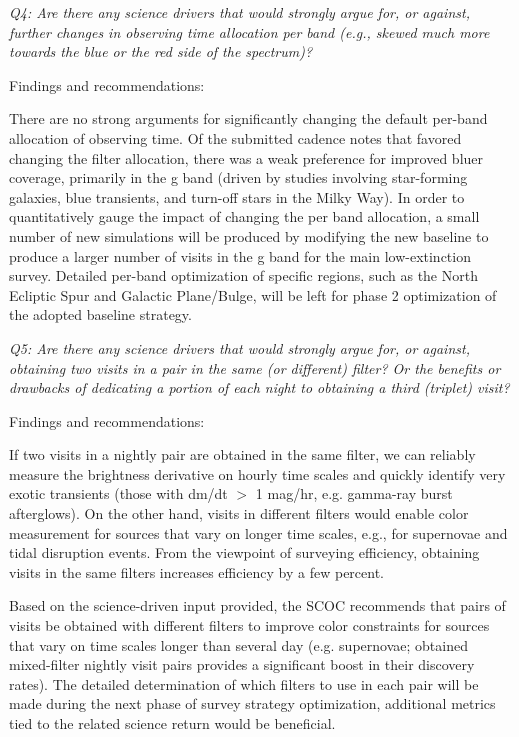 {\it Q4:  Are there any science drivers that would strongly argue for, or against, further changes in observing time allocation per band (e.g., skewed much more towards the blue or the red side of the spectrum)? }

Findings and recommendations:

There are no strong arguments for significantly changing the default per-band allocation of observing time. Of the submitted cadence notes that favored changing the filter allocation, there was a weak preference for improved bluer coverage, primarily in the g band (driven by studies involving star-forming galaxies, blue transients, and turn-off stars in the Milky Way). In order to quantitatively gauge the impact of changing the per band allocation, a small number of new simulations will be produced by modifying the new baseline to produce a larger number of visits in the g band for the main low-extinction survey. Detailed per-band optimization of specific regions, such as the North Ecliptic Spur and Galactic Plane/Bulge, will be left for phase 2 optimization of the adopted baseline strategy. 


{\it Q5:  Are there any science drivers that would strongly argue for, or against, obtaining two visits in a pair in the same (or different) filter? Or the benefits or drawbacks of dedicating  a portion of each night to obtaining a third (triplet) visit?   }

Findings and recommendations:

If two visits in a nightly pair are obtained in the same filter, we can reliably measure the brightness derivative on hourly time scales and quickly identify very exotic transients (those with dm/dt $>$ 1 mag/hr, e.g. gamma-ray burst afterglows). On the other hand, visits in different filters would enable color measurement for sources that vary on longer time scales, e.g., for supernovae and tidal disruption events. From the viewpoint of surveying efficiency, obtaining visits in the same filters increases efficiency by a few percent.

Based on the science-driven input provided, the SCOC recommends that pairs of visits be obtained with different filters to improve color constraints for sources that vary on time scales longer than several day (e.g. supernovae;  obtained mixed-filter nightly visit pairs provides a significant boost in their discovery rates). The detailed determination of which filters to use in each pair will be made during the next phase of survey strategy optimization, additional metrics tied to the related science return would be beneficial.  

